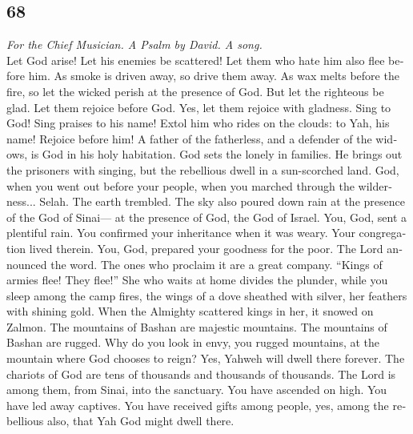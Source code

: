 \begin{paracol}{2}
\switchcolumn
\begin{otherlanguage}{english}

\hypertarget{section-135}{%
\section{68}\label{section-135}}

\emph{For the Chief Musician. A Psalm by David. A song.}\\
 Let God arise! Let his enemies be scattered! Let them who
hate him also flee before him.  As smoke is driven away,
so drive them away. As wax melts before the fire, so let the wicked
perish at the presence of God.  But let the righteous be
glad. Let them rejoice before God. Yes, let them rejoice with gladness.
 Sing to God! Sing praises to his name! Extol him who
rides on the clouds: to Yah, his name! Rejoice before him!
 A father of the fatherless, and a defender of the widows,
is God in his holy habitation.  God sets the lonely in
families. He brings out the prisoners with singing, but the rebellious
dwell in a sun-scorched land.  God, when you went out
before your people, when you marched through the wilderness... Selah.
 The earth trembled. The sky also poured down rain at the
presence of the God of Sinai--- at the presence of God, the God of
Israel.  You, God, sent a plentiful rain. You confirmed
your inheritance when it was weary.  Your congregation
lived therein. You, God, prepared your goodness for the poor.
 The Lord announced the word. The ones who proclaim it
are a great company.  ``Kings of armies flee! They
flee!'' She who waits at home divides the plunder,  while
you sleep among the camp fires, the wings of a dove sheathed with
silver, her feathers with shining gold.  When the
Almighty scattered kings in her, it snowed on Zalmon. 
The mountains of Bashan are majestic mountains. The mountains of Bashan
are rugged.  Why do you look in envy, you rugged
mountains, at the mountain where God chooses to reign? Yes, Yahweh will
dwell there forever.  The chariots of God are tens of
thousands and thousands of thousands. The Lord is among them, from
Sinai, into the sanctuary.  You have ascended on high.
You have led away captives. You have received gifts among people, yes,
among the rebellious also, that Yah God might dwell there.

\end{otherlanguage}
\end{paracol}
